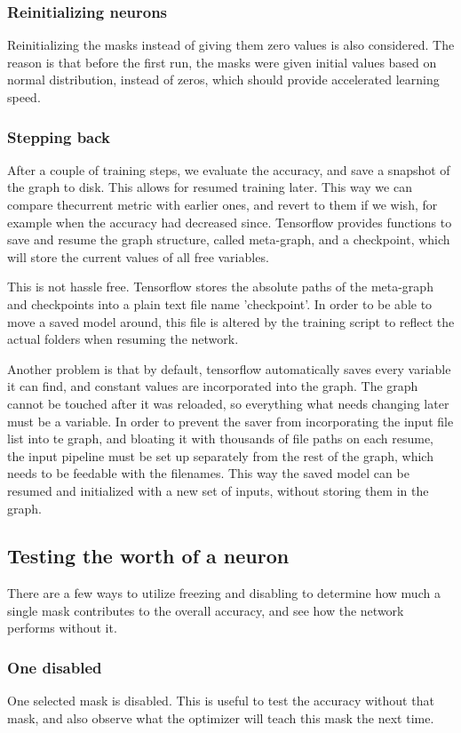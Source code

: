 \documentclass[12pt]{report}
\begin{document}
\subsubsection{Reinitializing neurons}
Reinitializing the masks instead of giving them zero values is also considered. The reason is that before the first run, the masks were given initial values based on normal distribution, instead of zeros, which should provide accelerated learning speed.
\subsubsection{Stepping back}
After a couple of training steps, we evaluate the accuracy, and save a snapshot of the graph to disk. This allows for resumed training later. This way we can compare thecurrent metric with earlier ones, and revert to them if we wish, for example when the accuracy had decreased since. Tensorflow provides functions to save and resume the graph structure, called meta-graph, and a checkpoint, which will store the current values of all free variables.\par

This is not hassle free. Tensorflow stores the absolute paths of the meta-graph and checkpoints into a plain text file name 'checkpoint'. In order to be able to move a saved model around, this file is altered by the training script to reflect the actual folders when resuming the network.\par

Another problem is that by default, tensorflow automatically saves every variable it can find, and constant values are incorporated into the graph. The graph cannot be touched after it was reloaded, so everything what needs changing later must be a variable. In order to prevent the saver from incorporating the input file list into te graph, and bloating it with thousands of file paths on each resume, the input pipeline must be set up separately from the rest of the graph, which needs to be feedable with the filenames. This way the saved model can be resumed and initialized with a new set of inputs, without storing them in the graph.
\subsection{Testing the worth of a neuron}
There are a few ways to utilize freezing and disabling to determine how much a single mask contributes to the overall accuracy, and see how the network performs without it.
\subsubsection{One disabled}One selected mask is disabled. This is useful to test the accuracy without that mask, and also observe what the optimizer will teach this mask the next time.
\end{document}
